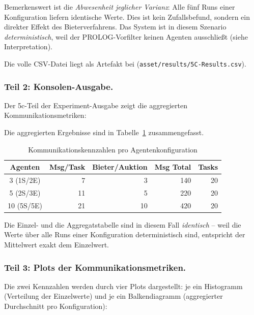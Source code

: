 Bemerkenswert ist die \textit{Abwesenheit jeglicher Varianz}: Alle fünf Runs einer Konfiguration liefern identische Werte. Dies ist kein Zufallsbefund, sondern ein direkter Effekt des Bieterverfahrens. Das System ist in diesem Szenario \textit{deterministisch}, weil der \acs{PROLOG}-Vorfilter keinen Agenten ausschließt (siehe Interpretation).

Die volle CSV-Datei liegt als Artefakt bei (\texttt{asset/results/5C-Results.csv}).

\subsubsection{Teil 2: Konsolen-Ausgabe.}
Der 5c-Teil der Experiment-Ausgabe zeigt die aggregierten Kommunikationsmetriken:



Die aggregierten Ergebnisse sind in Tabelle~\ref{tab:kommunikation_5c} zusammengefasst.

\begin{table}[H]
    \centering
    \begin{tabular}{c r r r r}
        \toprule
        \textbf{Agenten} & \textbf{Msg/Task} & \textbf{Bieter/Auktion} & \textbf{Msg Total} & \textbf{Tasks} \\
        \midrule
        3 (1S/2E)   & 7  & 3  & 140 & 20 \\
        5 (2S/3E)   & 11 & 5  & 220 & 20 \\
        10 (5S/5E)  & 21 & 10 & 420 & 20 \\
        \bottomrule
    \end{tabular}
    \caption{Kommunikationskennzahlen pro Agentenkonfiguration}
    \label{tab:kommunikation_5c}
\end{table}

Die Einzel- und die Aggregatstabelle sind in diesem Fall \textit{identisch} -- weil die Werte über alle Runs einer Konfiguration deterministisch sind, entspricht der Mittelwert exakt dem Einzelwert.

\subsubsection{Teil 3: Plots der Kommunikationsmetriken.}
Die zwei Kennzahlen werden durch vier Plots dargestellt: je ein Histogramm (Verteilung der Einzelwerte) und je ein Balkendiagramm (aggregierter Durchschnitt pro Konfiguration):

